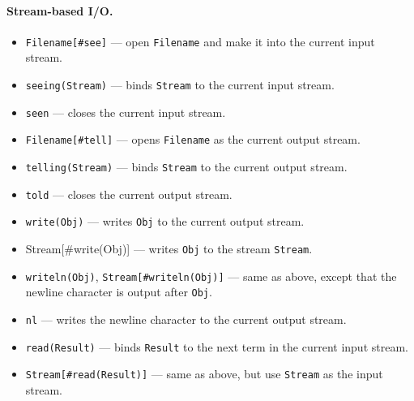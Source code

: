 \documentclass[11pt]{article}
\begin{document}
\paragraph{Stream-based I/O.}
\begin{itemize}
\item  {\tt Filename[\#see]} --- open {\tt Filename} and make it into the
  current input stream.
\item {\tt seeing(Stream)} --- binds {\tt Stream} to the current input
  stream.
\item {\tt seen} --- closes the current input stream.
\item {\tt Filename[\#tell]} --- opens {\tt Filename} as the current output
  stream.
\item {\tt telling(Stream)} --- binds {\tt Stream} to the current output
  stream. 
\item {\tt told} --- closes the current output stream.
\item {\tt write(Obj)} --- writes {\tt Obj} to the current output stream.
\item Stream[\#write(Obj)] --- writes {\tt Obj} to the stream {\tt Stream}.
\item {\tt writeln(Obj)}, {\tt Stream[\#writeln(Obj)]} --- same as above,
  except that the newline character is output after {\tt Obj}.
\item {\tt nl} --- writes the newline character to the current output
  stream.
\item {\tt read(Result)} --- binds {\tt Result} to the next term in the
  current input stream.
\item {\tt Stream[\#read(Result)]} --- same as above, but use {\tt Stream}
  as the input stream.
\end{itemize}
\end{document}
